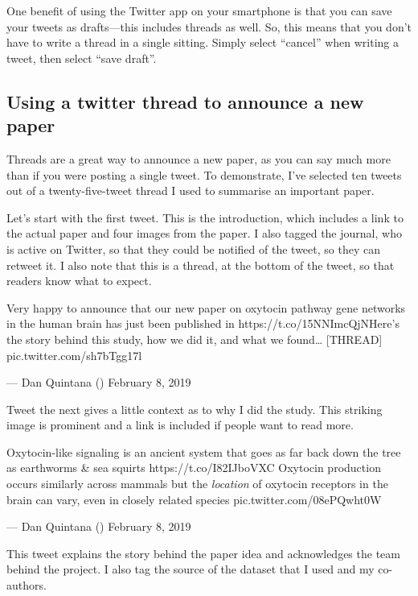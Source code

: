 \documentclass[]{book}
\begin{document}
One benefit of using the Twitter app on your smartphone is that you can save your tweets as drafts---this includes threads as well. So, this means that you don't have to write a thread in a single sitting. Simply select ``cancel'' when writing a tweet, then select ``save draft''.

\hypertarget{using-a-twitter-thread-to-announce-a-new-paper}{%
\subsection{Using a twitter thread to announce a new paper}\label{using-a-twitter-thread-to-announce-a-new-paper}}

Threads are a great way to announce a new paper, as you can say much more than if you were posting a single tweet. To demonstrate, I've selected ten tweets out of a twenty-five-tweet thread I used to summarise an important paper.

Let's start with the first tweet. This is the introduction, which includes a link to the actual paper and four images from the paper. I also tagged the journal, who is active on Twitter, so that they could be notified of the tweet, so they can retweet it. I also note that this is a thread, at the bottom of the tweet, so that readers know what to expect.

Very happy to announce that our new paper on oxytocin pathway gene networks in the human brain has just been published in \citet{NatureComms} https://t.co/15NNImcQjNHere's the story behind this study, how we did it, and what we found\ldots{} {[}THREAD{]} pic.twitter.com/sh7bTgg17l

--- Dan Quintana (\citet{dsquintana}) February 8, 2019

Tweet the next gives a little context as to why I did the study. This striking image is prominent and a link is included if people want to read more.

Oxytocin-like signaling is an ancient system that goes as far back down the tree as earthworms \& sea squirts https://t.co/I82IJboVXC Oxytocin production occurs similarly across mammals but the \emph{location} of oxytocin receptors in the brain can vary, even in closely related species pic.twitter.com/08ePQwht0W

--- Dan Quintana (\citet{dsquintana}) February 8, 2019

This tweet explains the story behind the paper idea and acknowledges the team behind the project. I also tag the source of the dataset that I used and my co-authors.
\end{document}
